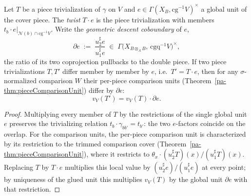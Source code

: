 \begin{theorem}
  \label{pa-thm:pieceComparisonUnit_twist}
  \leanok

  Let \(T\) be a piece trivialization of \(\gamma\) on \(V\) and \(e \in \Gamma(X_B, \mathrm{cg}^{-1}
  V)^{\times}\) a global unit of the cover piece. The \emph{twist} \(T \cdot e\) is the piece
  trivialization with members \(t_b \cdot e|_{\mathcal N(b) \cap \mathrm{cg}^{-1}V}\). Write the
  \emph{geometric descent coboundary} of \(e\),
  \[
    \partial e \;:=\; \frac{u_2^{\sharp} e}{u_1^{\sharp} e} \;\in\; \Gamma\bigl(X_{B \otimes_A B},\,
      \mathrm{cgq}^{-1}V\bigr)^{\times},
  \]
  the ratio of its two coprojection pullbacks to the double piece. If two piece trivializations \(T,
  T'\) differ member by member by \(e\), i.e.\ \(T' = T \cdot e\), then for any \(\sigma\)-normalized
  comparison \(W\) their per-piece comparison units (Theorem~\ref{pa-thm:pieceComparisonUnit}) differ by
  \(\partial e\):
  \[
    v_V(T') = v_V(T) \cdot \partial e .
  \]
\end{theorem}
\begin{proof}
  \leanok
  Multiplying every member of \(T\) by the restrictions of the single global unit \(e\) preserves the
  trivializing relation \(t_b \cdot \gamma_{b b'} = t_{b'}\): the two \(e\)-factors coincide on the
  overlap. For the comparison units, the per-piece comparison unit is characterized by its
  restriction to the trimmed comparison cover (Theorem~\ref{pa-thm:pieceComparisonUnit}), where it
  restricts to \(\theta_x \cdot (u_2^{\sharp}T)(x) / (u_1^{\sharp}T)(x)\). Replacing \(T\) by \(T
  \cdot e\) multiplies this local value by \((u_2^{\sharp}e)/(u_1^{\sharp}e)\) at every point; by
  uniqueness of the glued unit this multiplies \(v_V(T)\) by the global unit \(\partial e\) with that
  restriction.
\end{proof}

